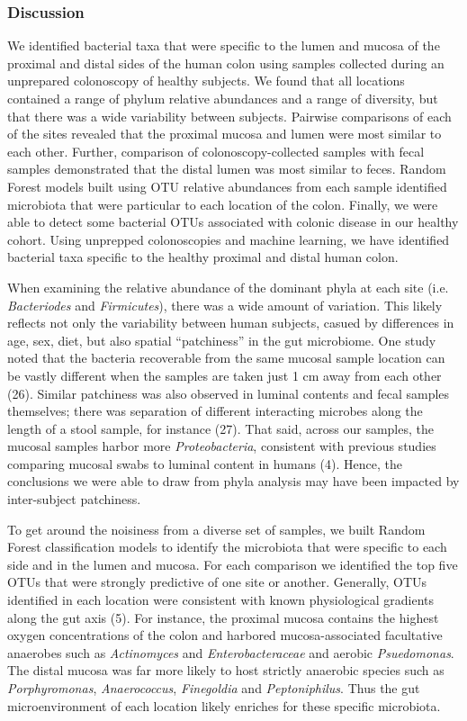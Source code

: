 \documentclass[12pt,]{article}
\begin{document}
\subsubsection{Discussion}\label{discussion}

We identified bacterial taxa that were specific to the lumen and mucosa
of the proximal and distal sides of the human colon using samples
collected during an unprepared colonoscopy of healthy subjects. We found
that all locations contained a range of phylum relative abundances and a
range of diversity, but that there was a wide variability between
subjects. Pairwise comparisons of each of the sites revealed that the
proximal mucosa and lumen were most similar to each other. Further,
comparison of colonoscopy-collected samples with fecal samples
demonstrated that the distal lumen was most similar to feces. Random
Forest models built using OTU relative abundances from each sample
identified microbiota that were particular to each location of the
colon. Finally, we were able to detect some bacterial OTUs associated
with colonic disease in our healthy cohort. Using unprepped
colonoscopies and machine learning, we have identified bacterial taxa
specific to the healthy proximal and distal human colon.

When examining the relative abundance of the dominant phyla at each site
(i.e. \emph{Bacteriodes} and \emph{Firmicutes}), there was a wide amount
of variation. This likely reflects not only the variability between
human subjects, casued by differences in age, sex, diet, but also
spatial ``patchiness'' in the gut microbiome. One study noted that the
bacteria recoverable from the same mucosal sample location can be vastly
different when the samples are taken just 1 cm away from each other
(26). Similar patchiness was also observed in luminal contents and fecal
samples themselves; there was separation of different interacting
microbes along the length of a stool sample, for instance (27). That
said, across our samples, the mucosal samples harbor more
\emph{Proteobacteria}, consistent with previous studies comparing
mucosal swabs to luminal content in humans (4). Hence, the conclusions
we were able to draw from phyla analysis may have been impacted by
inter-subject patchiness.

To get around the noisiness from a diverse set of samples, we built
Random Forest classification models to identify the microbiota that were
specific to each side and in the lumen and mucosa. For each comparison
we identified the top five OTUs that were strongly predictive of one
site or another. Generally, OTUs identified in each location were
consistent with known physiological gradients along the gut axis (5).
For instance, the proximal mucosa contains the highest oxygen
concentrations of the colon and harbored mucosa-associated facultative
anaerobes such as \emph{Actinomyces} and \emph{Enterobacteraceae} and
aerobic \emph{Psuedomonas}. The distal mucosa was far more likely to
host strictly anaerobic species such as \emph{Porphyromonas},
\emph{Anaerococcus}, \emph{Finegoldia} and \emph{Peptoniphilus}. Thus
the gut microenvironment of each location likely enriches for these
specific microbiota.
\end{document}
